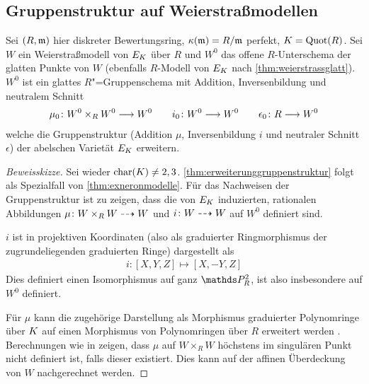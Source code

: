 \documentclass[german]{scrreprt}
\begin{document}
\subsection{Gruppenstruktur auf Weierstraßmodellen}
\begin{Lemma}\label{thm:erweiterunggruppenstruktur}
  Sei $(R,\mathfrak{m})$ hier diskreter Bewertungsring,
  $\kappa(\mathfrak{m})=R/\mathfrak{m}$ perfekt,
  $K=\operatorname{Quot}(R)$.
  Sei $W$ ein Weierstraßmodell von $E_{K}$ über $R$ und
  $W^0$ das offene $R$-Unterschema der glatten Punkte von $W$ 
  (ebenfalls $R$-Modell von $E_{K}$ nach \ref{thm:weierstrassglatt}).
  $W^0$ ist ein glattes $R$"=Gruppenschema
  mit Addition, Inversenbildung und neutralem Schnitt
  \begin{gather*}
    \mu_0\colon W^0\times_R W^0 \longrightarrow W^0
    \qquad
    i_0\colon W^0\longrightarrow W^0
    \qquad
    \epsilon_0\colon R\longrightarrow W^0
  \end{gather*}
  welche die Gruppenstruktur (Addition $\mu$, Inversenbildung $i$ und
  neutraler Schnitt $\epsilon$)
  der abelschen Varietät $E_{K}$ erweitern.

  
  \begin{proof}[Beweisskizze] Sei wieder $\operatorname{char}(K)\neq 2,3$.
    \ref{thm:erweiterunggruppenstruktur} folgt als Spezialfall von
    \ref{thm:exneronmodelle}.
    Für das Nachweisen der Gruppenstruktur ist zu zeigen, dass die von
    $E_{K}$ induzierten, rationalen Abbildungen $\mu\colon W\times_R
    W\dashrightarrow W$ und $i\colon W\dashrightarrow W$ auf $W^0$ definiert sind.

    $i$ ist in projektiven Koordinaten (also als graduierter
    Ringmorphismus der zugrundeliegenden graduierten Ringe)
    dargestellt als
    \begin{gather*}
      i\colon [X,Y,Z]\mapsto [X,-Y,Z]
    \end{gather*}
    Dies definiert einen Isomorphismus auf ganz $\P_R^2$, ist also
    insbesondere auf $W^0$ definiert.

    Für $\mu$ kann die zugehörige Darstellung als Morphismus
    graduierter Polynomringe über $K$ auf einen Morphismus von
    Polynomringen über $R$ erweitert werden \cite[vgl. Formeln für
    Addition in][Group Law Algorithm III.2.3]{silverman}.
    Berechnungen wie in \cite[Proposition 2.5]{silverman} zeigen, dass
    $\mu$ auf $W\times_R W$ höchstens im singulären Punkt nicht
    definiert ist, falls dieser existiert.
    Dies kann auf der affinen Überdeckung von $W$ nachgerechnet werden.
    

\end{proof}
\end{Lemma}
\end{document}
